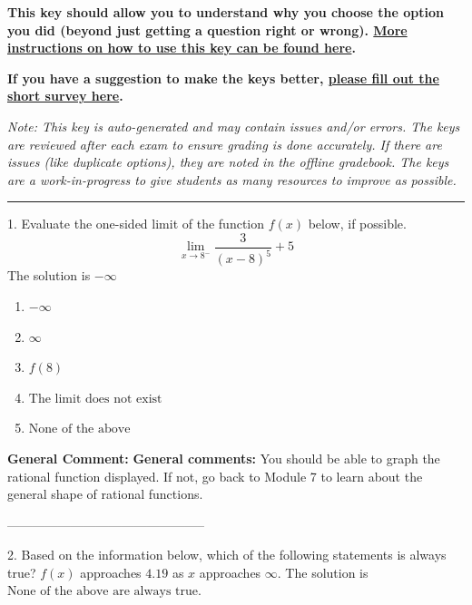 \documentclass{extbook}[14pt]
\begin{document}
\textbf{This key should allow you to understand why you choose the option you did (beyond just getting a question right or wrong). \href{https://xronos.clas.ufl.edu/mac1105spring2020/courseDescriptionAndMisc/Exams/LearningFromResults}{More instructions on how to use this key can be found here}.}

\textbf{If you have a suggestion to make the keys better, \href{https://forms.gle/CZkbZmPbC9XALEE88}{please fill out the short survey here}.}

\textit{Note: This key is auto-generated and may contain issues and/or errors. The keys are reviewed after each exam to ensure grading is done accurately. If there are issues (like duplicate options), they are noted in the offline gradebook. The keys are a work-in-progress to give students as many resources to improve as possible.}

\rule{\textwidth}{0.4pt}

1. Evaluate the one-sided limit of the function $f(x)$ below, if possible.
\[ \lim_{x \rightarrow 8^-} \frac{3}{(x-8)^5}+5 \] 
The solution is $ -\infty $ 

\begin{enumerate}[label=\Alph*.] 
\item $ -\infty $ 

  
\item $ \infty $ 

  
\item $ f(8) $ 

  
\item $ \text{The limit does not exist} $ 

  
\item $ \text{None of the above} $ 

  
\end{enumerate} 
 
\textbf{General Comment:} \textbf{General comments:} You should be able to graph the rational function displayed. If not, go back to Module 7 to learn about the general shape of rational functions. 

-----------------------------------------------

2. Based on the information below, which of the following statements is always true?
$f(x)$ approaches $4.19$ as $x$ approaches $\infty$. 
The solution is $ \text{None of the above are always true.} $ 
\end{document}
